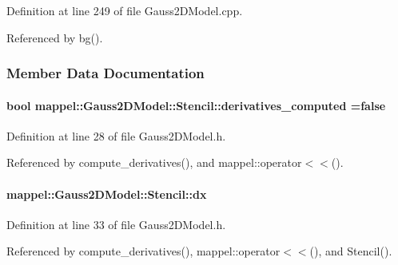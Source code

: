 Definition at line 249 of file Gauss2\+D\+Model.\+cpp.



Referenced by bg().



\subsubsection{Member Data Documentation}
\paragraph[{\texorpdfstring{derivatives\+\_\+computed}{derivatives_computed}}]{\setlength{\rightskip}{0pt plus 5cm}bool mappel\+::\+Gauss2\+D\+Model\+::\+Stencil\+::derivatives\+\_\+computed =false}\hypertarget{classmappel_1_1Gauss2DModel_1_1Stencil_a3934a1152e447ec858bf576a7da4d305}{}\label{classmappel_1_1Gauss2DModel_1_1Stencil_a3934a1152e447ec858bf576a7da4d305}


Definition at line 28 of file Gauss2\+D\+Model.\+h.



Referenced by compute\+\_\+derivatives(), and mappel\+::operator$<$$<$().

\paragraph[{\texorpdfstring{dx}{dx}}]{ mappel\+::\+Gauss2\+D\+Model\+::\+Stencil\+::dx}\hypertarget{classmappel_1_1Gauss2DModel_1_1Stencil_a1326ab9634585b882909abf468f9cd36}{}\label{classmappel_1_1Gauss2DModel_1_1Stencil_a1326ab9634585b882909abf468f9cd36}


Definition at line 33 of file Gauss2\+D\+Model.\+h.



Referenced by compute\+\_\+derivatives(), mappel\+::operator$<$$<$(), and Stencil().

